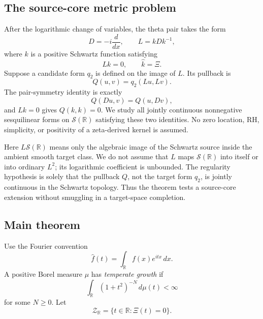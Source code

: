 \documentclass[11pt]{article}
\newcommand{\R}{\mathbb R}
\newcommand{\cS}{\mathcal S}
\newcommand{\cZ}{\mathcal Z}
\begin{document}
\subsection{The source-core metric problem}

After the logarithmic change of variables, the theta pair takes the form
\[
 D=-i\frac{d}{dx},\qquad L=kDk^{-1},
 \tag{1.4}
\]
where \(k\) is a positive Schwartz function satisfying
\[
 Lk=0,\qquad \widehat k=\Xi.
 \tag{1.5}
\]
Suppose a candidate form \(q_2\) is defined on the image of \(L\).  Its pullback is
\[
 Q(u,v)=q_2(Lu,Lv).
 \tag{1.6}
\]
The pair-symmetry identity is exactly
\[
 Q(Du,v)=Q(u,Dv),
 \tag{1.7}
\]
and \(Lk=0\) gives \(Q(k,k)=0\).  We study all jointly continuous nonnegative
sesquilinear forms on \(\cS(\R)\) satisfying these two identities.  No zero location, RH,
simplicity, or positivity of a zeta-derived kernel is assumed.

Here \(L\cS(\R)\) means only the algebraic image of the Schwartz source inside the ambient
smooth target class.  We do not assume that \(L\) maps \(\cS(\R)\) into itself or into ordinary
\(L^2\); its logarithmic coefficient is unbounded.  The regularity hypothesis is solely that the
pullback \(Q\), not the target form \(q_2\), is jointly continuous in the Schwartz topology.
Thus the theorem tests a source-core extension without smuggling in a target-space completion.

\subsection{Main theorem}

Use the Fourier convention
\[
 \widehat f(t)=\int_{\R}f(x)e^{itx}\,dx.
 \tag{1.8}
\]
A positive Borel measure \(\mu\) has \emph{temperate growth} if
\[
 \int_{\R}(1+t^2)^{-N}\,d\mu(t)<\infty
 \tag{1.9}
\]
for some \(N\ge0\).  Let
\[
 \cZ_{\R}=\{t\in\R:\Xi(t)=0\}.
 \tag{1.10}
\]
\end{document}
